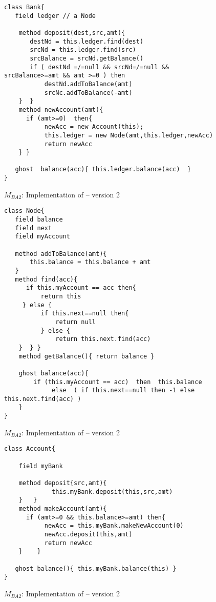 \begin{figure}[htb]
\begin{lstlisting}
class Bank{
   field ledger // a Node
   
    method deposit(dest,src,amt){
       destNd = this.ledger.find(dest)
       srcNd = this.ledger.find(src)
       srcBalance = srcNd.getBalance()
       if ( destNd =/=null && srcNd=/=null && srcBalance>=amt && amt >=0 ) then
           destNd.addToBalance(amt)
           srcNc.addToBalance(-amt)           
    }  }     
    method newAccount(amt){
      if (amt>=0)  then{
           newAcc = new Account(this);
           this.ledger = new Node(amt,this.ledger,newAcc)
           return newAcc 
    } }
   
   ghost  balance(acc){ this.ledger.balance(acc)  } 
}
\end{lstlisting}
 \vspace*{-7mm}
\caption{$M_{BA2}$: Implementation of    -- version 2}
\label{fig:BanAccImplV2b}
\end{figure}

 
\begin{figure}[htb]
\begin{lstlisting}
class Node{
   field balance
   field next   
   field myAccount
   
   method addToBalance(amt){
       this.balance = this.balance + amt
   }   
   method find(acc){
      if this.myAccount == acc then{
          return this
     } else { 
          if this.next==null then{
              return null
          } else {
              return this.next.find(acc)
    }  } } 
    method getBalance(){ return balance }
    
    ghost balance(acc){
        if (this.myAccount == acc)  then  this.balance
             else  ( if this.next==null then -1 else this.next.find(acc) )
    }
}          
\end{lstlisting}
 \vspace*{-7mm}
\caption{$M_{BA2}$: Implementation of    -- version 2}
\label{fig:BanAccImplV2n}
\end{figure}

\begin{figure}[htb]
\begin{lstlisting}
class Account{

    field myBank
    
    method deposit{src,amt){
             this.myBank.deposit(this,src,amt)
    }   }    
    method makeAccount(amt){
      if (amt>=0 && this.balance>=amt) then{
           newAcc = this.myBank.makeNewAccount(0)
           newAcc.deposit(this,amt)
           return newAcc
    }    }     

   ghost balance(){ this.myBank.balance(this) }   
}
\end{lstlisting}
 \vspace*{-7mm}
\caption{$M_{BA2}$: Implementation of   -- version 2}
\label{fig:BanAccImplV2a}
\end{figure}
 


